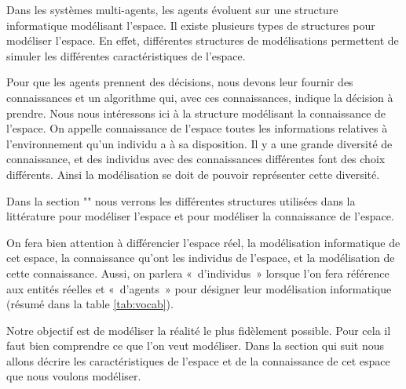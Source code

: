 \documentclass[a4paper]{article}
\begin{document}
Dans les systèmes multi-agents, les agents évoluent sur une structure
informatique modélisant l'espace. Il existe plusieurs types de structures pour
modéliser l'espace. En effet, différentes structures de modélisations permettent
de simuler les différentes caractéristiques de l'espace.

Pour que les agents prennent des décisions, nous devons leur fournir des
connaissances et un algorithme qui, avec ces connaissances, indique la décision
à prendre. Nous nous intéressons ici à la structure modélisant la connaissance
de l'espace. On appelle connaissance de l'espace toutes les informations
relatives à l'environnement qu'un individu a à sa disposition. Il y a une grande
diversité de connaissance, et des individus avec des connaissances différentes
font des choix différents. Ainsi la modélisation se doit de pouvoir représenter
cette diversité.

Dans la section "" nous verrons les différentes structures
utilisées dans la littérature pour modéliser l'espace et pour modéliser la
connaissance de l'espace.

On fera bien attention à différencier l'espace réel, la modélisation
informatique de cet espace, la connaissance qu'ont les individus de l'espace, et
la modélisation de cette connaissance. Aussi, on parlera «~d'individus~» lorsque
l'on fera référence aux entités réelles et «~d'agents~» pour désigner leur
modélisation informatique (résumé dans la table \ref{tab:vocab}).

\begin{table}
  \noindent{}
  \caption{Le vocabulaire utilisé, en fonction de si on parle de
  l'environnement réel ou de la modélisation informatique}
  \label{tab:vocab}
\end{table}

Notre objectif est de modéliser la réalité le plus fidèlement possible. Pour
cela il faut bien comprendre ce que l'on veut modéliser. Dans la section qui
suit nous allons décrire les caractéristiques de l'espace et de la connaissance
de cet espace que nous voulons modéliser.
\end{document}
